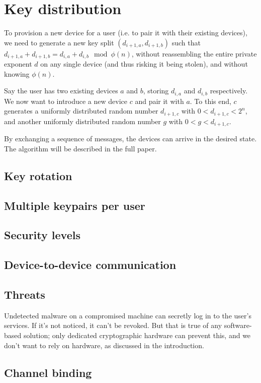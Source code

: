 \section{Key distribution}

To provision a new device for a user (i.e. to pair it with their existing devices), we need to
generate a new key split $(d_{i+1,a}, d_{i+1,b})$ such that
$d_{i+1,a} + d_{i+1,b} = d_{i,a} + d_{i,b} \mod \phi(n)$, without reassembling the entire private
exponent $d$ on any single device (and thus risking it being stolen), and without knowing $\phi(n)$.

Say the user has two existing devices $a$ and $b$, storing $d_{i,a}$ and $d_{i,b}$ respectively. We
now want to introduce a new device $c$ and pair it with $a$. To this end, $c$ generates a uniformly
distributed random number $d_{i+1,c}$ with $0 < d_{i+1,c} < 2^n$, and another uniformly distributed
random number $g$ with $0 < g < d_{i+1,c}$.

By exchanging a sequence of messages, the devices can arrive in the desired state. The algorithm
will be described in the full paper.

\subsection{Key rotation}
\subsection{Multiple keypairs per user}
\subsection{Security levels}
\subsection{Device-to-device communication}
\subsection{Threats}
Undetected malware on a compromised machine can secretly log in to the user's services. If it's not
noticed, it can't be revoked. But that is true of any software-based solution; only dedicated
cryptographic hardware can prevent this, and we don't want to rely on hardware, as discussed in the
introduction.

\subsection{Channel binding}

